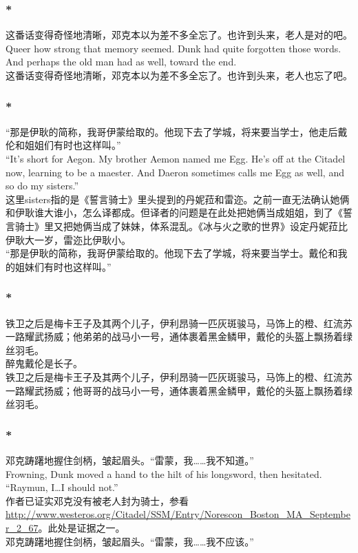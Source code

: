 \documentclass[12pt,a4paper]{article}
\newcommand{\h}[1]{{\color{red}#1}\\}
\newcommand{\la}[1]{{\color{blue}#1}\\}
\begin{document}
\subsubsection{\color{red}*}\la{
	这番话变得奇怪地清晰，邓克本以为差不多全忘了。也许到头来，老人是对的吧。\\
	Queer how strong that memory seemed. Dunk had quite forgotten those words. And perhaps the old man had as well, toward the end.}
	这番话变得奇怪地清晰，邓克本以为差不多全忘了。也许到头来，老人也忘了吧。
	
\subsubsection{\color{red}*}\label{0.1.10}\la{
	“那是伊耿的简称，我哥伊蒙给取的。他现下去了学城，将来要当学士，他走后戴伦和姐姐们有时也这样叫。”\\
	“It's short for Aegon. My brother Aemon named me Egg. He's off at the Citadel now, learning to be a maester. And Daeron sometimes calls me Egg as well, and so do my sisters.”}\h{
	这里sisters指的是《誓言骑士》里头提到的丹妮菈和雷迩。之前一直无法确认她俩和伊耿谁大谁小，怎么译都成。但译者的问题是在此处把她俩当成姐姐，到了《誓言骑士》里又把她俩当成了妹妹，体系混乱。《冰与火之歌的世界》设定丹妮菈比伊耿大一岁，雷迩比伊耿小。}
	“那是伊耿的简称，我哥伊蒙给取的。他现下去了学城，将来要当学士。戴伦和我的姐妹们有时也这样叫。”
	
\subsubsection{\color{red}*}\la{
	铁卫之后是梅卡王子及其两个儿子，伊利昂骑一匹灰斑骏马，马饰上的橙、红流苏一路耀武扬威；他弟弟的战马小一号，通体裹着黑金鳞甲，戴伦的头盔上飘扬着绿丝羽毛。}\h{
	醉鬼戴伦是长子。}
	铁卫之后是梅卡王子及其两个儿子，伊利昂骑一匹灰斑骏马，马饰上的橙、红流苏一路耀武扬威；他哥哥的战马小一号，通体裹着黑金鳞甲，戴伦的头盔上飘扬着绿丝羽毛。
	
\subsubsection{\color{red}*}\la{
	邓克踌躇地握住剑柄，皱起眉头。“雷蒙，我……我不知道。”\\
	Frowning, Dunk moved a hand to the hilt of his longsword, then hesitated. “Raymun, I\ldots  I should not.”}\h{
	作者已证实邓克没有被老人封为骑士，参看\url{http://www.westeros.org/Citadel/SSM/Entry/Norescon_Boston_MA_September_2_67}。此处是证据之一。}
	邓克踌躇地握住剑柄，皱起眉头。“雷蒙，我……我不应该。”
	
\end{document}
